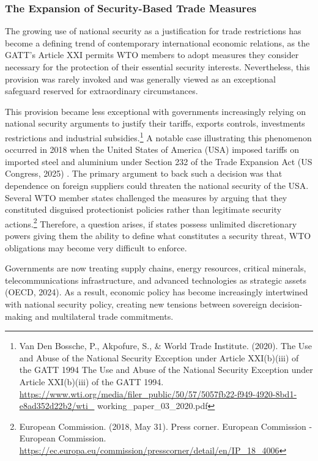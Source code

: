 \subsubsection{The Expansion of Security-Based Trade Measures}

The growing use of national security as a justification for trade restrictions has become a defining trend of contemporary international economic relations, as the GATT’s Article XXI permits WTO members to adopt measures they consider necessary for the protection of their essential security interests. Nevertheless, this provision was rarely invoked and was generally viewed as an exceptional safeguard reserved for extraordinary circumstances.

This provision became less exceptional with governments increasingly relying on national security arguments to justify their tariffs, exports controls, investments restrictions and industrial subsidies.\footnote{Van Den Bossche, P., Akpofure, S., \& World Trade Institute. (2020). The Use and Abuse of the National Security Exception under Article XXI(b)(iii) of the GATT 1994 The Use and Abuse of the National Security Exception under Article XXI(b)(iii) of the GATT 1994. \url{https://www.wti.org/media/filer_public/50/57/5057fb22-f949-4920-8bd1-e8ad352d22b2/wti_} working\_paper\_03\_2020.pdf} A notable case illustrating this phenomenon occurred in 2018 when the United States of America (USA) imposed tariffs on imported steel and aluminium under Section 232 of the Trade Expansion Act (US Congress, 2025) . The primary argument to back such a decision was that dependence on foreign suppliers could threaten the national security of the USA. Several WTO member states challenged the measures by arguing that they constituted disguised protectionist policies rather than legitimate security actions.\footnote{European Commission. (2018, May 31). Press corner. European Commission - European Commission. \url{https://ec.europa.eu/commission/presscorner/detail/en/IP_18_4006}} Therefore, a question arises, if states possess unlimited discretionary powers giving them the ability to define what constitutes a security threat, WTO obligations may become very difficult to enforce.

Governments are now treating supply chains, energy resources, critical minerals, telecommunications infrastructure, and advanced technologies as strategic assets (OECD, 2024). As a result, economic policy has become increasingly intertwined with national security policy, creating new tensions between sovereign decision-making and multilateral trade commitments.

